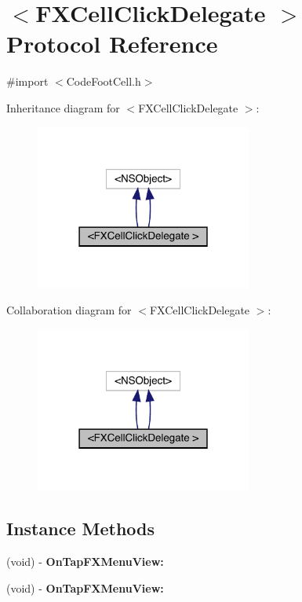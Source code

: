 \hypertarget{protocol_f_x_cell_click_delegate_01-p}{}\section{$<$F\+X\+Cell\+Click\+Delegate $>$ Protocol Reference}
\label{protocol_f_x_cell_click_delegate_01-p}


{\ttfamily \#import $<$Code\+Foot\+Cell.\+h$>$}



Inheritance diagram for $<$F\+X\+Cell\+Click\+Delegate $>$\+:\nopagebreak
\begin{figure}[H]
\begin{center}
\leavevmode
\includegraphics[width=202pt]{protocol_f_x_cell_click_delegate_01-p__inherit__graph}
\end{center}
\end{figure}


Collaboration diagram for $<$F\+X\+Cell\+Click\+Delegate $>$\+:\nopagebreak
\begin{figure}[H]
\begin{center}
\leavevmode
\includegraphics[width=202pt]{protocol_f_x_cell_click_delegate_01-p__coll__graph}
\end{center}
\end{figure}
\subsection*{Instance Methods}
\begin{DoxyCompactItemize}
\item 
\mbox{\label{protocol_f_x_cell_click_delegate_01-p_a0ed9b60506e59c4e2daee4a2ad9e51af}} 
(void) -\/ {\bfseries On\+Tap\+F\+X\+Menu\+View\+:}
\item 
\mbox{\label{protocol_f_x_cell_click_delegate_01-p_a0ed9b60506e59c4e2daee4a2ad9e51af}} 
(void) -\/ {\bfseries On\+Tap\+F\+X\+Menu\+View\+:}
\end{DoxyCompactItemize}


